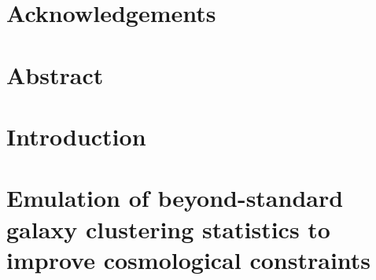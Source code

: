 \documentclass[12pt,oneside,letterpaper]{report}
\begin{document}
\chapter*{Acknowledgements}



\newpage


\chapter*{Abstract}



\newpage


\tableofcontents


\cleardoublepage
{}
{}
\listoffigures
\newpage


\cleardoublepage
{}
{}
\listoftables
\newpage





\setcounter{chapter}{-1}

\chapter{Introduction}
\setcounter{section}{-1}
\label{chp-introduction}


\chapter{Emulation of beyond-standard galaxy clustering statistics to improve cosmological constraints}
\setcounter{section}{-1}
\label{chp-aemulus}
%
\end{document}
